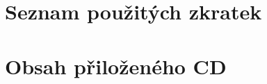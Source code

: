 \documentclass[thesis=B,czech,hidelinks]{dependencies/Thesis}
\begin{document}

\renewcommand{\thefigure}{\arabic{chapter}.\arabic{figure}}
\renewcommand{\figurename}{Obrázek}

\renewcommand{\thetable}{\arabic{chapter}.\arabic{table}}
\renewcommand{\tablename}{Tabulka}

\renewcommand{\thelisting}{\arabic{chapter}.\arabic{listing}}



\begin{introduction}
   \listoftodos
   
\end{introduction}










\begin{conclusion}
   
\end{conclusion}

\begin{literature}
   \printbibliography[heading=none]
\end{literature}



\appendix

\chapter{Seznam použitých zkratek}
\printglossary[type=\acronymtype,style=acronyms]

\chapter{Obsah přiloženého CD}


\end{document}
